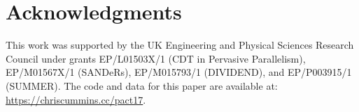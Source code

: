 \section*{Acknowledgments}

This work was supported by the UK Engineering and Physical Sciences Research
Council under grants EP/L01503X/1 (CDT in Pervasive Parallelism), EP/M01567X/1
(SANDeRs), EP/M015793/1 (DIVIDEND), and EP/P003915/1 (SUMMER). The code and data
for this paper are available at: \url{https://chriscummins.cc/pact17}.
